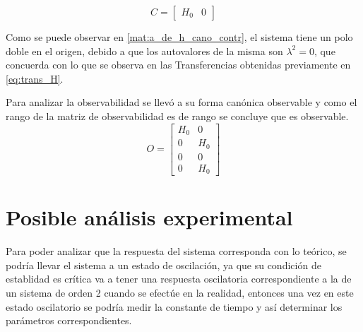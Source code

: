 \documentclass[letterpaper, 10 pt, conference]{ieeeconf}  %
\begin{document}
\begin{equation} \label{mat:c_de_h_cano_contr}
  C =
  \begin{bmatrix}
    H_0 & 0
  \end{bmatrix}
\end{equation} 

Como se puede observar en \ref{mat:a_de_h_cano_contr}, el sistema tiene un polo doble en el origen, debido a que los autovalores de la misma son $\lambda^{2}=0$, que concuerda con lo que se observa en las Transferencias obtenidas previamente en \ref{eq:trans_H}.

Para analizar la observabilidad se llevó a su forma canónica observable y como el rango de la matriz de observabilidad es de rango se concluye que es observable.
\begin{equation} \label{mat:observabilidad}
  O =
  \begin{bmatrix}
    H_0 & 0\\
    0   & H_0\\
    0   & 0\\
    0   & H_0
  \end{bmatrix}
\end{equation} 

\section{Posible análisis experimental}
Para poder analizar que la respuesta del sistema corresponda con lo teórico, se podría llevar el sistema a un estado de oscilación, ya que su condición de establidad es crítica va a tener una respuesta oscilatoria correspondiente a la de un sistema de orden 2 cuando se efectúe en la realidad, entonces una vez en este estado oscilatorio se podría medir la constante de tiempo y así determinar los parámetros correspondientes.
\end{document}

